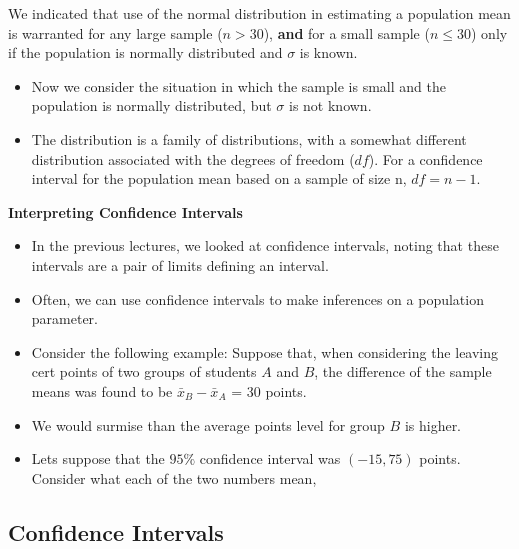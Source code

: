 \documentclass[]{report}
\begin{document}

We indicated that use of the normal distribution in estimating a population mean is warranted
for any large sample ($n > 30$), \textbf{and} for a small sample ($n \leq 30$) only if the population is normally distributed
and $\sigma$ is known.


\begin{itemize}
\item Now we consider the situation in which the sample is small and the population is normally distributed,
but $\sigma$ is not known.
\item The distribution is a family of distributions, with
a somewhat different distribution associated with the degrees of freedom ($df$). For a confidence interval for the
population mean based on a sample of size n, $df = n - 1$.
\end{itemize}





\textbf{Interpreting Confidence Intervals}
\begin{itemize}
\item In the previous lectures, we looked at confidence intervals, noting that these intervals are a pair of limits defining an interval.
\item Often, we can use confidence intervals to make inferences on a population parameter.
\item Consider the following example: Suppose that, when considering the leaving cert points of two groups of students $A$ and $B$, the difference of the sample means was found to be $\bar{x}_B-\bar{x}_A$ = 30 points.
\item We would surmise than the average points level for group $B$ is higher.
\item Lets suppose that the $95\%$ confidence interval was $(-15,75)$ points. Consider what each of the two numbers mean,
\end{itemize}

\subsection{Confidence Intervals}
\end{document}
